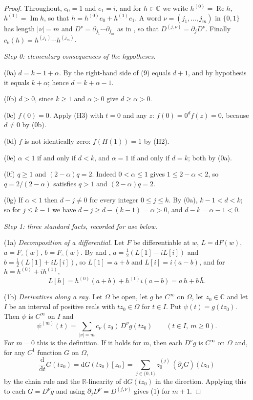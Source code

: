 \begin{proof}
Throughout, $e_0=1$ and $e_1=i$, and for $h\in\mathbb{C}$ we write
$h^{(0)}=\operatorname{Re}h$, $h^{(1)}=\operatorname{Im}h$, so that
$h=h^{(0)}e_0+h^{(1)}e_1$.  A word $\nu=(j_1,\dots,j_m)$ in $\{0,1\}$ has
length $|\nu|=m$ and $D^\nu=\partial_{j_1}\cdots\partial_{j_m}$ as in
, so that $D^{(j,\nu)}=\partial_j D^\nu$.  Finally
$c_\nu(h)=h^{(j_1)}\cdots h^{(j_m)}$.

\emph{Step 0: elementary consequences of the hypotheses.}

\noindent(0a) $d=k-1+\alpha$.  By  the right-hand
side of (9) equals $d+1$, and by hypothesis it equals $k+\alpha$; hence
$d=k+\alpha-1$.

\noindent(0b) $d>0$, since $k\ge1$ and $\alpha>0$ give $d\ge\alpha>0$.

\noindent(0c) $f(0)=0$.  Apply (H3) with $t=0$ and any $z$: $f(0)=0^{d}f(z)=0$,
because $d\neq0$ by (0b).

\noindent(0d) $f$ is not identically zero: $f(H(1))=1$ by (H2).

\noindent(0e) $\alpha<1$ if and only if $d<k$, and $\alpha=1$ if and only if
$d=k$; both by (0a).

\noindent(0f) $q\ge1$ and $(2-\alpha)q=2$.  Indeed $0<\alpha\le1$ gives
$1\le2-\alpha<2$, so $q=2/(2-\alpha)$ satisfies $q>1$ and
$(2-\alpha)q=2$.

\noindent(0g) If $\alpha<1$ then $d-j\neq0$ for every integer $0\le j\le k$.
By (0a), $k-1<d<k$; so for $j\le k-1$ we have $d-j\ge d-(k-1)=\alpha>0$, and
$d-k=\alpha-1<0$.

\emph{Step 1: three standard facts, recorded for use below.}

\noindent(1a) \emph{Decomposition of a differential.}  Let $F$ be
differentiable at $w$, $L=\mathrm{d}F(w)$, $a=F_z(w)$, $b=F_{\bar z}(w)$.  By
 and , $a=\tfrac12(L[1]-iL[i])$ and
$b=\tfrac12(L[1]+iL[i])$, so $L[1]=a+b$ and $L[i]=i(a-b)$, and for
$h=h^{(0)}+ih^{(1)}$,
\[
  L[h]=h^{(0)}(a+b)+h^{(1)}i(a-b)=a\,h+b\,\bar h .
\]

\noindent(1b) \emph{Derivatives along a ray.}  Let $\Omega$ be open, let $g$ be
$C^\infty$ on $\Omega$, let $z_0\in\mathbb{C}$ and let $I$ be an interval of
positive reals with $tz_0\in\Omega$ for $t\in I$.  Put $\psi(t)=g(tz_0)$.  Then
$\psi$ is $C^\infty$ on $I$ and
\begin{equation}\tag{1}
  \psi^{(m)}(t)=\sum_{|\nu|=m}c_\nu(z_0)\,D^\nu g(tz_0)\qquad(t\in I,\ m\ge0).
\end{equation}
For $m=0$ this is the definition.  If it holds for $m$, then each $D^\nu g$ is
$C^\infty$ on $\Omega$ and, for any $C^1$ function $G$ on $\Omega$,
\[
  \frac{\mathrm{d}}{\mathrm{d}t}G(tz_0)=\mathrm{d}G(tz_0)[z_0]
  =\sum_{j\in\{0,1\}}z_0^{(j)}\,(\partial_jG)(tz_0)
\]
by the chain rule and the $\mathbb{R}$-linearity of $\mathrm{d}G(tz_0)$ in the
direction.  Applying this to each $G=D^\nu g$ and using
$\partial_jD^\nu=D^{(j,\nu)}$ gives (1) for $m+1$.


\end{proof}
